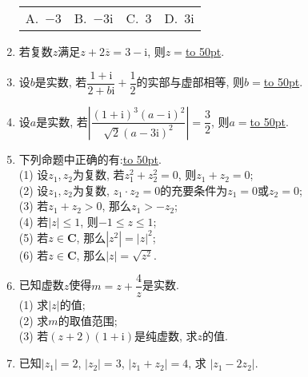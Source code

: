 \documentclass[10pt,a4paper]{article}
\newcommand{\blank}[1]{\underline{\hbox to #1pt{}}}
\newcommand{\fourch}[4]{\par\begin{tabular}{p{.23\textwidth}p{.23\textwidth}p{.23\textwidth}p{.23\textwidth}}
A.~#1 &B.~#2& C.~#3& D.~#4
\end{tabular}}
\begin{document}
\begin{enumerate}[1.]
\fourch{$-3$}{$-3\mathrm{i}$}{$3$}{$3\mathrm{i}$}
\item 若复数$z$满足$z+2\overline z=3-\mathrm{i}$, 则$z=$\blank{50}.
\item 设$b$是实数, 若$\dfrac{1+\mathrm{i}}{2+b\mathrm{i}}+\dfrac 12$的实部与虚部相等, 则$b=$\blank{50}.
\item 设$a$是实数, 若$|\dfrac{(1+\mathrm{i})^3(a-\mathrm{i})^2}{\sqrt{2}(a-3\mathrm{i})^2}|=\dfrac 32$, 则$a=$\blank{50}.
\item 下列命题中正确的有:\blank{50}.\\
(1) 设$z_1,z_2$为复数, 若$z_1^2+z_2^2=0$, 则$z_1+z_2=0$;\\
(2) 设$z_1,z_2$为复数, $z_1\cdot z_2=0$的充要条件为$z_1=0$或$z_2=0$;\\
(3) 若$z_1+z_2>0$, 那么$z_1>-z_2$;\\
(4) 若$|z|\le 1$, 则$-1\le z\le 1$;\\
(5) 若$z\in \mathbf{C}$, 那么$|z^2|=|z|^2$;\\
(6) 若$z\in \mathbf{C}$, 那么$|z|=\sqrt{z^2}$.
\item 已知虚数$z$使得$m=z+\dfrac 4z$是实数.\\
(1) 求$|z|$的值;\\
(2) 求$m$的取值范围;\\
(3) 若$(z+2)(1+\mathrm{i})$是纯虚数, 求$z$的值.\\
\item 已知$|z_1|=2$, $|z_2|=3$, $|z_1+z_2|=4$, 求 $|z_1-2z_2|$.



\end{enumerate}
\end{document}
